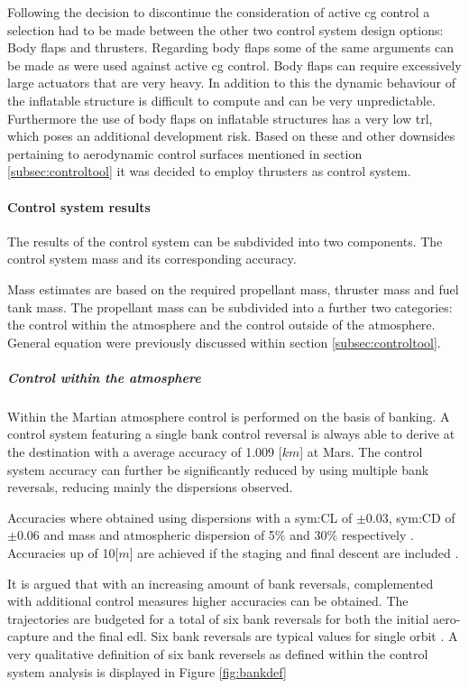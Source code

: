 Following the decision to discontinue the consideration of active \gls{cg} control a selection had to be made between the other two control system design options: Body flaps and thrusters. Regarding body flaps some of the same arguments can be made as were used against active \gls{cg} control. Body flaps can require excessively large actuators that are very heavy. In addition to this the dynamic behaviour of the inflatable structure is difficult to compute and can be very unpredictable. Furthermore the use of body flaps on inflatable structures has a very low \acrlong{trl}, which poses an additional development risk. Based on these and other downsides pertaining to aerodynamic control surfaces mentioned in section \ref{subsec:controltool} it was decided to employ thrusters as control system.

\paragraph{Control system results}

The results of the control system can be subdivided into two components. The control system mass and its corresponding accuracy.

Mass estimates are based on the required propellant mass, thruster mass and fuel tank mass. The propellant mass can be subdivided into a further two categories: the control within the atmosphere and the control outside of the atmosphere. General equation were previously discussed within section \ref{subsec:controltool}.

\subparagraph{Control within the atmosphere} 

Within the Martian atmosphere control is performed on the basis of banking. A control system featuring a single bank control reversal is always able to derive at the destination with a average accuracy of 1.009 [$km$]\cite{Lu2007} at Mars. The control system accuracy can further be significantly reduced by using multiple bank reversals, reducing mainly the dispersions observed. 

Accuracies where obtained using dispersions with a \gls{sym:CL} of $\pm 0.03 $, \gls{sym:CD}  of $\pm 0.06 $ and mass and atmospheric dispersion of 5\% and 30\% respectively \cite{Lu2007}. Accuracies up of 10[$m$] are achieved if the staging and final descent are included \cite{Davis2010}. 

It is argued that with an increasing amount of bank reversals, complemented with additional control measures higher accuracies can be obtained. The trajectories are budgeted for a total of six bank reversals for both the initial aero-capture and the final \gls{edl}. Six bank reversals are typical values for single orbit \cite{Lu2007, Cianciolo2010}. A very qualitative definition of six bank reversels as defined within the control system analysis is displayed in Figure \ref{fig:bankdef}

